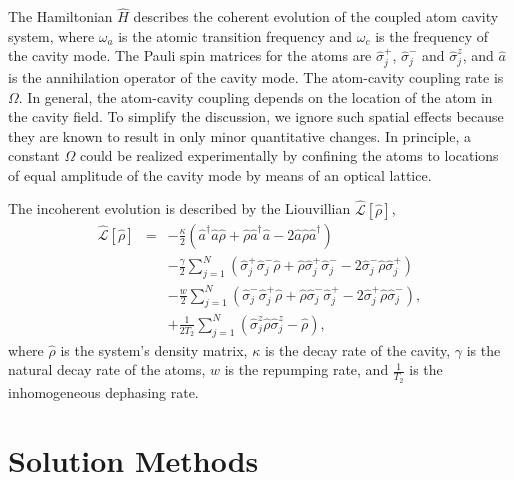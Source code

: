 \documentclass[aps,
twocolumn,
showpacs,
superscriptaddress,groupedaddress]{revtex4}
\begin{document}
The Hamiltonian $\hat{H}$ describes the coherent evolution of the
coupled atom cavity system, where $\omega_{a}$ is the atomic transition
frequency and $\omega_c$ is the frequency of the cavity mode. The Pauli
spin matrices for the atoms are $\hat{\sigma}_j^{+}$,
$\hat{\sigma}_j^{-}$ and $\hat{\sigma}_j^{z}$, and $\hat{a}$ is the
annihilation operator of the cavity mode. The atom-cavity coupling rate
is $\Omega$.  In general, the atom-cavity coupling depends on the
location of the atom in the cavity field.  To simplify the discussion, we ignore
such spatial effects because they are known to result in only minor
quantitative changes.  In principle, a constant $\Omega$ could be
realized experimentally by confining the atoms to locations of equal
amplitude of the cavity mode by means of an optical lattice.

The incoherent evolution is described by the Liouvillian
$\hat{\mathcal{L}}\left[ \hat{\rho} \right]$,
\begin{eqnarray}
\hat{\mathcal{L}}\left[ \hat{\rho} \right] &=&
  -\frac{\kappa}{2}
  \left(
    \hat{a}^{\dagger} \hat{a} \hat{\rho}
    + \hat{\rho}  \hat{a}^{\dagger} \hat{a}
    - 2\hat{a} \hat{\rho} \hat{a}^{\dagger}
  \right)
\nonumber
\\
 &&-\frac{\gamma}{2} \sum_{j=1}^N
  \left(
   \hat{\sigma}_{j}^{+} \hat{\sigma}_{j}^{-} \hat{\rho}
   + \hat{\rho} \hat{\sigma}_{j}^{+} \hat{\sigma}_{j}^{-}
   - 2\hat{\sigma}_{j}^{-} \hat{\rho} \hat{\sigma}_{j}^{+}
  \right)
\nonumber
\\
 &&-\frac{w}{2} \sum_{j=1}^N
  \left(
   \hat{\sigma}_{j}^{-} \hat{\sigma}_{j}^{+} \hat{\rho}
   + \hat{\rho} \hat{\sigma}_{j}^{-} \hat{\sigma}_{j}^{+}
   - 2\hat{\sigma}_{j}^{+} \hat{\rho}  \hat{\sigma}_{j}^{-}
  \right),
\nonumber
\\
 &&+\frac{1}{2T_2} \sum_{j=1}^N
  \left(
   \hat{\sigma}_{j}^{z} \hat{\rho}  \hat{\sigma}_{j}^{z} - \hat{\rho}
  \right),
\end{eqnarray}
where $\hat{\rho}$ is the system's density matrix, $\kappa$ is the decay
rate of the cavity, $\gamma$ is the natural decay rate of the atoms, $w$
is the repumping rate, and $\frac{1}{T_2}$ is the inhomogeneous
dephasing rate.


\section{Solution Methods}
\label{sec:Methods}
\end{document}
